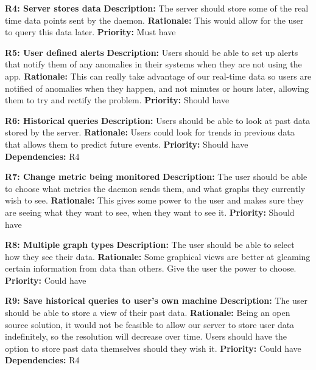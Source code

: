 \documentclass{l3proj}
\begin{document}
\textbf{R4: Server stores data} \newline
\textbf{Description:} The server should store some of the real time data points sent by the daemon. \newline
\textbf{Rationale:} This would allow for the user to query this data later. \newline
\textbf{Priority:} Must have

\textbf{R5: User defined alerts} \newline
\textbf{Description:} Users should be able to set up alerts that notify them of any anomalies in their systems when they are not using the app. \newline
\textbf{Rationale:} This can really take advantage of our real-time data so users are notified of anomalies when they happen, and not minutes or hours later, allowing them to try and rectify the problem. \newline
\textbf{Priority:} Should have

\textbf{R6: Historical queries} \newline
\textbf{Description:} Users should be able to look at past data stored by the server. \newline
\textbf{Rationale:} Users could look for trends in previous data that allows them to predict future events. \newline
\textbf{Priority:} Should have \newline
\textbf{Dependencies:} R4

\textbf{R7: Change metric being monitored} \newline
\textbf{Description:} The user should be able to choose what metrics the daemon sends them, and what graphs they currently wish to see. \newline
\textbf{Rationale:} This gives some power to the user and makes sure they are seeing what they want to see, when they want to see it. \newline
\textbf{Priority:} Should have

\textbf{R8: Multiple graph types} \newline
\textbf{Description:} The user should be able to select how they see their data. \newline
\textbf{Rationale:} Some graphical views are better at gleaming certain information from data than others. Give the user the power to choose. \newline
\textbf{Priority:} Could have

\textbf{R9: Save historical queries to user's own machine} \newline
\textbf{Description:} The user should be able to store a view of their past data. \newline
\textbf{Rationale:} Being an open source solution, it would not be feasible to allow our server to store user data indefinitely, so the resolution will decrease over time. Users should have the option to store past data themselves should they wish it. \newline
\textbf{Priority:} Could have \newline
\textbf{Dependencies:} R4
\end{document}
